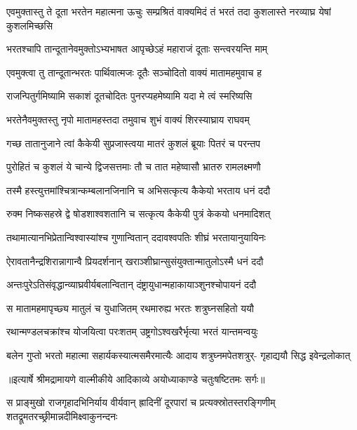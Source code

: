 \threelineshloka
{एवमुक्तास्तु ते दूता भरतेन महात्मना}
{ऊचुः सम्प्रश्रितं वाक्यमिदं तं भरतं तदा}
{कुशलास्ते नरव्याघ्र येषां कुशलमिच्छसि} %

\twolineshloka
{भरतश्चापि तान्दूतानेवमुक्तोऽभ्यभाषत}
{आपृच्छेऽहं महाराजं दूताः सन्त्वरयन्ति माम्} %

\twolineshloka
{एवमुक्त्वा तु तान्दूतान्भरतः पार्थिवात्मजः}
{दूतैः सञ्चोदितो वाक्यं मातामहमुवाच ह} %

\twolineshloka
{राजन्पितुर्गमिष्यामि सकाशं दूतचोदितः}
{पुनरप्यहमेष्यामि यदा मे त्वं स्मरिष्यसि} %

\twolineshloka
{भरतेनैवमुक्तस्तु नृपो मातामहस्तदा}
{तमुवाच शुभं वाक्यं शिरस्याघ्राय राघवम्} %

\twolineshloka
{गच्छ तातानुजाने त्वां कैकेयी सुप्रजास्त्वया}
{मातरं कुशलं ब्रूयाः पितरं च परन्तप} %

\twolineshloka
{पुरोहितं च कुशलं ये चान्ये द्विजसत्तमाः}
{तौ च तात महेष्वासौ भ्रातरु रामलक्ष्मणौ} %

\twolineshloka
{तस्मै हस्त्युत्तमांश्चित्रान्कम्बलानजिनानि च}
{अभिसत्कृत्य कैकेयो भरताय धनं ददौ} %

\twolineshloka
{रुक्म निष्कसहस्रे द्वे षोडशाश्वशतानि च}
{सत्कृत्य कैकेयी पुत्रं केकयो धनमादिशत्} %

\twolineshloka
{तथामात्यानभिप्रेतान्विश्वास्यांश्च गुणान्वितान्}
{ददावश्वपतिः शीघ्रं भरतायानुयायिनः} %

\twolineshloka
{ऐरावतानैन्द्रशिरान्नागान्वै प्रियदर्शनान्}
{खराञ्शीघ्रान्सुसंयुक्तान्मातुलोऽस्मै धनं ददौ} %

\twolineshloka
{अन्तःपुरेऽतिसंवृद्धान्व्याघ्रवीर्यबलान्वितान्}
{दंष्ट्रायुधान्महाकायाञ्शुनश्चोपायनं ददौ} %

\twolineshloka
{स मातामहमापृच्छ्य मातुलं च युधाजितम्}
{रथमारुह्य भरतः शत्रुघ्नसहितो ययौ} %

\twolineshloka
{रथान्मण्डलचक्रांश्च योजयित्वा परःशतम्}
{उष्ट्रगोऽश्वखरैर्भृत्या भरतं यान्तमन्वयुः} %

\fourlineindentedshloka
{बलेन गुप्तो भरतो महात्मा}
{सहार्यकस्यात्मसमैरमात्यैः}
{आदाय शत्रुघ्नमपेतशत्रुर्-}
{गृहाद्ययौ सिद्ध इवेन्द्रलोकात्} %


{॥इत्यार्षे श्रीमद्रामायणे वाल्मीकीये आदिकाव्ये अयोध्याकाण्डे चतुःषष्टितमः सर्गः॥}


\threelineshloka
{स प्राङ्मुखो राजगृहादभिनिर्याय वीर्यवान्}
{ह्रादिनीं दूरपारां च प्रत्यक्स्रोतस्तरङ्गिणीम्}
{शतद्रूमतरच्छ्रीमान्नदीमिक्ष्वाकुनन्दनः} %

